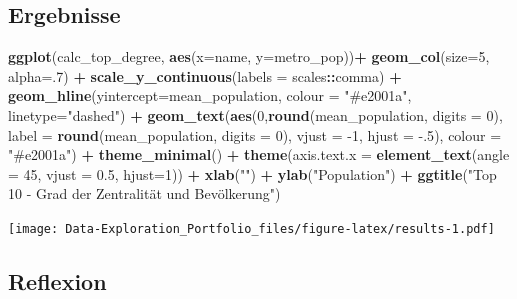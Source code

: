 \documentclass[]{article}
\newenvironment{Shaded}{\begin{snugshade}}{\end{snugshade}}
\newcommand{\DataTypeTok}[1]{\textcolor[rgb]{0.13,0.29,0.53}{#1}}
\newcommand{\DecValTok}[1]{\textcolor[rgb]{0.00,0.00,0.81}{#1}}
\newcommand{\FloatTok}[1]{\textcolor[rgb]{0.00,0.00,0.81}{#1}}
\newcommand{\KeywordTok}[1]{\textcolor[rgb]{0.13,0.29,0.53}{\textbf{#1}}}
\newcommand{\NormalTok}[1]{#1}
\newcommand{\OperatorTok}[1]{\textcolor[rgb]{0.81,0.36,0.00}{\textbf{#1}}}
\newcommand{\StringTok}[1]{\textcolor[rgb]{0.31,0.60,0.02}{#1}}
\begin{document}
\hypertarget{ergebnisse}{%
\subsection{Ergebnisse}\label{ergebnisse}}

\begin{Shaded}
\end{Shaded}

\begin{Shaded}
\begin{Highlighting}[]
\KeywordTok{ggplot}\NormalTok{(calc_top_degree, }\KeywordTok{aes}\NormalTok{(}\DataTypeTok{x=}\NormalTok{name, }\DataTypeTok{y=}\NormalTok{metro_pop))}\OperatorTok{+}
\StringTok{  }\KeywordTok{geom_col}\NormalTok{(}\DataTypeTok{size=}\DecValTok{5}\NormalTok{, }\DataTypeTok{alpha=}\NormalTok{.}\DecValTok{7}\NormalTok{) }\OperatorTok{+}
\StringTok{  }\KeywordTok{scale_y_continuous}\NormalTok{(}\DataTypeTok{labels =}\NormalTok{ scales}\OperatorTok{::}\NormalTok{comma) }\OperatorTok{+}
\StringTok{  }\KeywordTok{geom_hline}\NormalTok{(}\DataTypeTok{yintercept=}\NormalTok{mean_population, }\DataTypeTok{colour =} \StringTok{"#e2001a"}\NormalTok{, }\DataTypeTok{linetype=}\StringTok{"dashed"}\NormalTok{) }\OperatorTok{+}
\StringTok{  }\KeywordTok{geom_text}\NormalTok{(}\KeywordTok{aes}\NormalTok{(}\DecValTok{0}\NormalTok{,}\KeywordTok{round}\NormalTok{(mean_population, }\DataTypeTok{digits =} \DecValTok{0}\NormalTok{), }\DataTypeTok{label =} \KeywordTok{round}\NormalTok{(mean_population, }\DataTypeTok{digits =} \DecValTok{0}\NormalTok{), }\DataTypeTok{vjust =} \DecValTok{-1}\NormalTok{, }\DataTypeTok{hjust =} \FloatTok{-.5}\NormalTok{), }\DataTypeTok{colour =} \StringTok{"#e2001a"}\NormalTok{) }\OperatorTok{+}
\StringTok{  }\KeywordTok{theme_minimal}\NormalTok{() }\OperatorTok{+}
\StringTok{  }\KeywordTok{theme}\NormalTok{(}\DataTypeTok{axis.text.x =} \KeywordTok{element_text}\NormalTok{(}\DataTypeTok{angle =} \DecValTok{45}\NormalTok{, }\DataTypeTok{vjust =} \FloatTok{0.5}\NormalTok{, }\DataTypeTok{hjust=}\DecValTok{1}\NormalTok{)) }\OperatorTok{+}
\StringTok{  }\KeywordTok{xlab}\NormalTok{(}\StringTok{""}\NormalTok{) }\OperatorTok{+}
\StringTok{  }\KeywordTok{ylab}\NormalTok{(}\StringTok{"Population"}\NormalTok{) }\OperatorTok{+}
\StringTok{  }\KeywordTok{ggtitle}\NormalTok{(}\StringTok{"Top 10 - Grad der Zentralität und Bevölkerung"}\NormalTok{)}
\end{Highlighting}
\end{Shaded}

\texttt{[image: Data-Exploration\_Portfolio\_files/figure-latex/results-1.pdf]}

\hypertarget{reflexion}{%
\subsection{Reflexion}\label{reflexion}}
\end{document}
